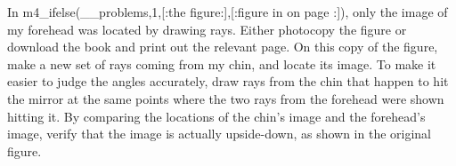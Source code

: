 In
m4_ifelse(__problems,1,[:the figure:],[:figure  in on page \pageref{fig:real-and-virtual}:]), only the image of my
forehead was located by drawing rays. Either photocopy the
figure or download the book and print out the relevant page.
On this copy of the figure, make a new set of rays coming from my chin,
and locate its image. To make it easier to judge the angles
accurately, draw rays from the chin that happen to hit the
mirror at the same points where the two rays from the
forehead were shown hitting it. By comparing the locations
of the chin's image and the forehead's image, verify that
the image is actually upside-down, as shown in the original figure.
